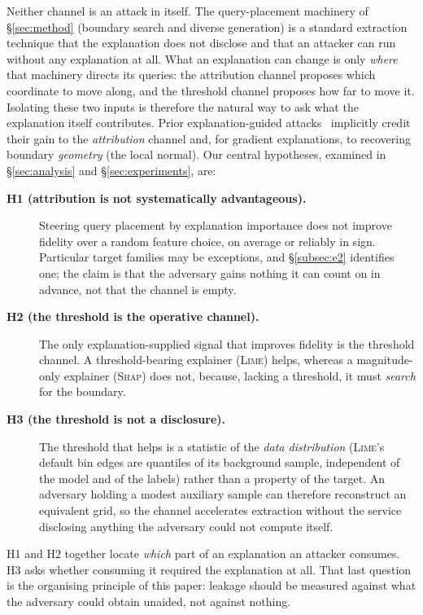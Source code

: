 \documentclass[sigconf,anonymous,review]{acmart}
\begin{document}
Neither channel is an attack in itself. The query-placement machinery of \S\ref{sec:method} (boundary search and diverse generation) is a standard extraction technique that the explanation does not
disclose and that an attacker can run without any explanation at all. What an explanation can change is
only \emph{where} that machinery directs its queries: the attribution channel proposes which coordinate
to move along, and the threshold channel proposes how far to move it. Isolating these two inputs is
therefore the natural way to ask what the explanation itself contributes. Prior explanation-guided
attacks~\cite{oksuz2024autolycus,milli2019model} implicitly credit their gain to the
\emph{attribution} channel and, for gradient explanations, to recovering boundary \emph{geometry} (the
local normal). Our central hypotheses, examined
in \S\ref{sec:analysis} and \S\ref{sec:experiments}, are:
\begin{description}
  \item[\textbf{H1 (attribution is not systematically advantageous).}] Steering query placement by
  explanation importance does not improve fidelity over a random feature choice, on average or
  reliably in sign. Particular target families may be exceptions, and \S\ref{subsec:e2} identifies
  one; the claim is that the adversary gains nothing it can count on in advance, not that the channel
  is empty.
  \item[\textbf{H2 (the threshold is the operative channel).}] The only explanation-supplied
  signal that improves fidelity is the threshold channel. A threshold-bearing explainer
  (\textsc{Lime}) helps, whereas a magnitude-only explainer (\textsc{Shap}) does not, because, lacking a threshold, it must \emph{search} for the boundary.
  \item[\textbf{H3 (the threshold is not a disclosure).}] The threshold that helps is a
  statistic of the \emph{data distribution} (\textsc{Lime}'s default bin edges are quantiles of its background sample, independent of the model and of the labels) rather than a
  property of the target. An adversary holding a modest auxiliary sample can therefore
  reconstruct an equivalent grid, so the channel accelerates extraction without the service
  disclosing anything the adversary could not compute itself.
\end{description}
H1 and H2 together locate \emph{which} part of an explanation an attacker consumes. H3 asks whether consuming it required the explanation at all. That last question is the organising
principle of this paper: leakage should be measured against what the adversary could obtain
unaided, not against nothing.
\end{document}
